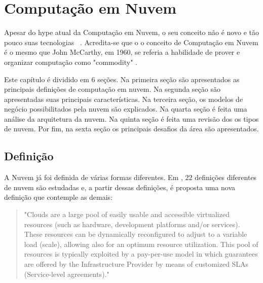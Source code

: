 \chapter{Computação em Nuvem}
Apesar do hype  atual da Computação em Nuvem,
o seu conceito não é novo e tão pouco suas
tecnologias~\cite{CloudUncovered:2012} . Acredita-se que o o conceito de Computação em
Nuvem é o mesmo que John McCarthy, em 1960, se referia a habilidade de prover
e organizar computação como "commodity"  . 


Este capítulo é dividido em 6 seções. Na primeira seção são apresentados as
principais definições de computação em nuvem. Na segunda seção são
apresentadas suas principais características. Na terceira seção, os modelos de
negócio possibilitados pela nuvem são explicados. Na quarta seção é feita uma
análise da arquitetura da nuvem. Na quinta seção é feita uma revisão dos os
tipos de nuvem. Por fim, na sexta seção os principais desafios da área são
apresentados.  

\section{Definição} \label{cloud:def}

A Nuvem já foi definida de várias formas diferentes. Em
\cite{CloudDefinition:2009} , 22  definições diferentes de nuvem são estudadas e, a partir dessas definições, é proposta uma nova definição que contemple as demais:
	
	\begin{quotation}
		"Clouds are a large pool of easily usable and accessible virtualized resources (such as hardware, development platforms and/or services). These resources can be dynamically reconfigured to adjust to a variable load (scale), allowing also for an optimum resource utilization. This pool of resources is typically exploited by a pay-per-use model in which guarantees are offered by the Infrastructure Provider by means of customized SLAs (Service-level agreements)."
	\end{quotation}
	
